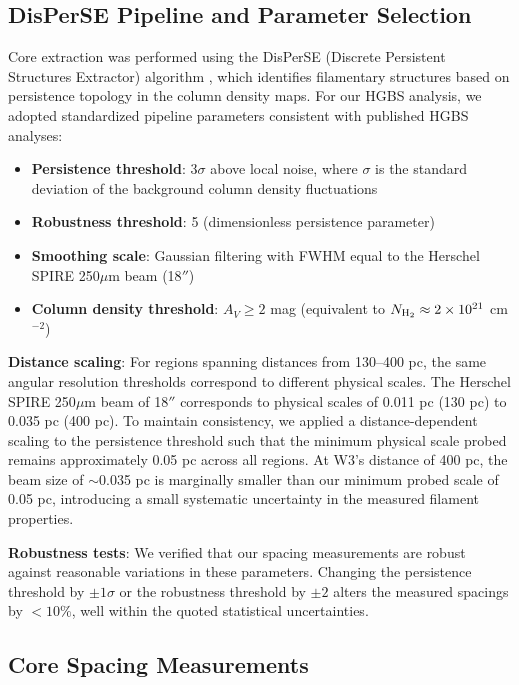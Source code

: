 \documentclass[11pt,a4paper]{article}
\begin{document}
\subsection{DisPerSE Pipeline and Parameter Selection}

Core extraction was performed using the DisPerSE (Discrete Persistent Structures Extractor) algorithm \citep{Sousbie2011}, which identifies filamentary structures based on persistence topology in the column density maps. For our HGBS analysis, we adopted standardized pipeline parameters consistent with published HGBS analyses:

\begin{itemize}
    \item \textbf{Persistence threshold}: $3\sigma$ above local noise, where $\sigma$ is the standard deviation of the background column density fluctuations
    \item \textbf{Robustness threshold}: 5 (dimensionless persistence parameter)
    \item \textbf{Smoothing scale}: Gaussian filtering with FWHM equal to the Herschel SPIRE 250$\mu$m beam (18$''$)
    \item \textbf{Column density threshold}: $A_V \geq 2$ mag (equivalent to $N_{\rm H_2} \approx 2 \times 10^{21}$ cm$^{-2}$)
\end{itemize}

\textbf{Distance scaling}: For regions spanning distances from 130--400 pc, the same angular resolution thresholds correspond to different physical scales. The Herschel SPIRE 250$\mu$m beam of 18$''$ corresponds to physical scales of 0.011 pc (130 pc) to 0.035 pc (400 pc). To maintain consistency, we applied a distance-dependent scaling to the persistence threshold such that the minimum physical scale probed remains approximately 0.05 pc across all regions. At W3's distance of 400 pc, the beam size of $\sim$0.035 pc is marginally smaller than our minimum probed scale of 0.05 pc, introducing a small systematic uncertainty in the measured filament properties.

\textbf{Robustness tests}: We verified that our spacing measurements are robust against reasonable variations in these parameters. Changing the persistence threshold by $\pm 1\sigma$ or the robustness threshold by $\pm 2$ alters the measured spacings by $<10\%$, well within the quoted statistical uncertainties.

\subsection{Core Spacing Measurements}
\end{document}
